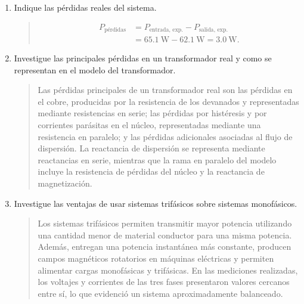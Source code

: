 \documentclass[12pt,a4paper]{article}
\begin{document}
\begin{enumerate}
\begin{quote}
\begin{align*}
            P_{\text{entrada, teórica}}&=V_p I_p=(210)(0.27)=\SI{56.7}{\watt},\\
            P_{\text{salida, teórica}}&=V_s I_s=(21)(2.7)=\SI{56.7}{\watt}.
        \end{align*}
        Usando los valores medidos, las potencias experimentales fueron:
        \begin{align*}
            P_{\text{entrada, exp.}}&=(217)(0.3)=\SI{65.1}{\watt},\\
            P_{\text{salida, exp.}}&=(23)(2.7)=\SI{62.1}{\watt}.
        \end{align*}
    \end{quote}
    \item Indique las pérdidas reales del sistema.
    \begin{quote}
        \begin{align*}
            P_{\text{pérdidas}}&=P_{\text{entrada, exp.}}-P_{\text{salida, exp.}}\\
            &=\SI{65.1}{\watt}-\SI{62.1}{\watt}=\SI{3.0}{\watt}.
        \end{align*}
    \end{quote}
    \item Investigue las principales pérdidas en un transformador real y como se representan en el modelo del transformador.
    \begin{quote}
        Las pérdidas principales de un transformador real son las pérdidas en el cobre, producidas por la resistencia de los devanados y representadas mediante resistencias en serie; las pérdidas por histéresis y por corrientes parásitas en el núcleo, representadas mediante una resistencia en paralelo; y las pérdidas adicionales asociadas al flujo de dispersión. La reactancia de dispersión se representa mediante reactancias en serie, mientras que la rama en paralelo del modelo incluye la resistencia de pérdidas del núcleo y la reactancia de magnetización.
    \end{quote}
    \item Investigue las ventajas de usar sistemas trifásicos sobre sistemas monofásicos.
    \begin{quote}
        Los sistemas trifásicos permiten transmitir mayor potencia utilizando una cantidad menor de material conductor para una misma potencia. Además, entregan una potencia instantánea más constante, producen campos magnéticos rotatorios en máquinas eléctricas y permiten alimentar cargas monofásicas y trifásicas. En las mediciones realizadas, los voltajes y corrientes de las tres fases presentaron valores cercanos entre sí, lo que evidenció un sistema aproximadamente balanceado.
    \end{quote}
\end{enumerate}
\end{document}
